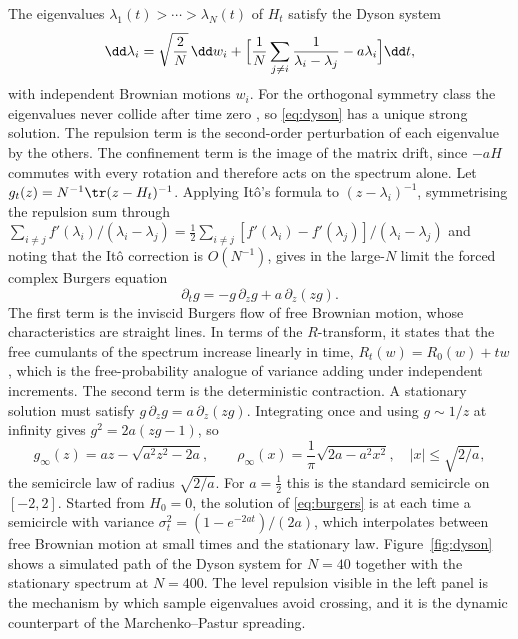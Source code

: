 The eigenvalues $\lambda_1(t)>\cdots>\lambda_N(t)$ of $H_t$ satisfy the Dyson system
\begin{equation}
 \dd\lambda_i=\sqrt{\frac2N}\,\dd w_i+\Bigl[\frac1N\sum_{j\neq i}\frac1{\lambda_i-\lambda_j}-a\lambda_i\Bigr]\dd t,
 \label{eq:dyson}
\end{equation}
with independent Brownian motions $w_i$. For the orthogonal symmetry class the eigenvalues never collide after time zero \citep[Section 4.3]{anderson2010introduction}, so \eqref{eq:dyson} has a unique strong solution. The repulsion term is the second-order perturbation of each eigenvalue by the others. The confinement term is the image of the matrix drift, since $-aH$ commutes with every rotation and therefore acts on the spectrum alone. Let $g_t(z)=N^{-1}\tr(z-H_t)^{-1}$. Applying It\^o's formula to $(z-\lambda_i)^{-1}$, symmetrising the repulsion sum through $\sum_{i\ne j}f'(\lambda_i)/(\lambda_i-\lambda_j)=\tfrac12\sum_{i\neq j}[f'(\lambda_i)-f'(\lambda_j)]/(\lambda_i-\lambda_j)$ and noting that the It\^o correction is $O(N^{-1})$, gives in the large-$N$ limit the forced complex Burgers equation
\begin{equation}
 \partial_tg=-g\,\partial_zg+a\,\partial_z(zg).
 \label{eq:burgers}
\end{equation}
The first term is the inviscid Burgers flow of free Brownian motion, whose characteristics are straight lines. In terms of the $R$-transform, it states that the free cumulants of the spectrum increase linearly in time, $R_t(w)=R_0(w)+tw$, which is the free-probability analogue of variance adding under independent increments. The second term is the deterministic contraction. A stationary solution must satisfy $g\,\partial_zg=a\,\partial_z(zg)$. Integrating once and using $g\sim1/z$ at infinity gives $g^2=2a(zg-1)$, so
\[
 g_\infty(z)=az-\sqrt{a^2z^2-2a},\qquad \rho_\infty(x)=\frac1\pi\sqrt{2a-a^2x^2},\quad|x|\le\sqrt{2/a},
\]
the semicircle law of radius $\sqrt{2/a}$. For $a=\tfrac12$ this is the standard semicircle on $[-2,2]$. Started from $H_0=0$, the solution of \eqref{eq:burgers} is at each time a semicircle with variance $\sigma_t^2=(1-e^{-2at})/(2a)$, which interpolates between free Brownian motion at small times and the stationary law. Figure~\ref{fig:dyson} shows a simulated path of the Dyson system for $N=40$ together with the stationary spectrum at $N=400$. The level repulsion visible in the left panel is the mechanism by which sample eigenvalues avoid crossing, and it is the dynamic counterpart of the Marchenko--Pastur spreading.

